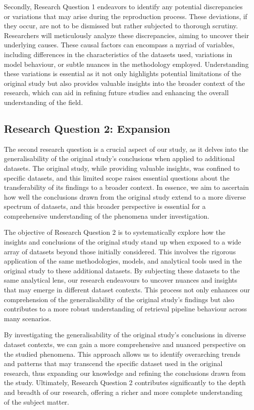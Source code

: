 Secondly, Research Question 1 endeavors to identify any potential discrepancies or variations that may arise during the reproduction process. These deviations, if they occur, are not to be dismissed but rather subjected to thorough scrutiny. Researchers will meticulously analyze these discrepancies, aiming to uncover their underlying causes. These causal factors can encompass a myriad of variables, including differences in the characteristics of the datasets used, variations in model behaviour, or subtle nuances in the methodology employed. Understanding these variations is essential as it not only highlights potential limitations of the original study but also provides valuable insights into the broader context of the research, which can aid in refining future studies and enhancing the overall understanding of the field.

\subsection{Research Question 2: Expansion}
The second research question is a crucial aspect of our study, as it delves into the generalisability of the original study's conclusions when applied to additional datasets. The original study, while providing valuable insights, was confined to specific datasets, and this limited scope raises essential questions about the transferability of its findings to a broader context. In essence, we aim to ascertain how well the conclusions drawn from the original study extend to a more diverse spectrum of datasets, and this broader perspective is essential for a comprehensive understanding of the phenomena under investigation.

The objective of Research Question 2 is to systematically explore how the insights and conclusions of the original study stand up when exposed to a wide array of datasets beyond those initially considered. This involves the rigorous application of the same methodologies, models, and analytical tools used in the original study to these additional datasets. By subjecting these datasets to the same analytical lens, our research endeavours to uncover nuances and insights that may emerge in different dataset contexts. This process not only enhances our comprehension of the generalisability of the original study's findings but also contributes to a more robust understanding of retrieval pipeline behaviour across many scenarios.

By investigating the generalisability of the original study's conclusions in diverse dataset contexts, we can gain a more comprehensive and nuanced perspective on the studied phenomena. This approach allows us to identify overarching trends and patterns that may transcend the specific dataset used in the original research, thus expanding our knowledge and refining the conclusions drawn from the study. Ultimately, Research Question 2 contributes significantly to the depth and breadth of our research, offering a richer and more complete understanding of the subject matter.


